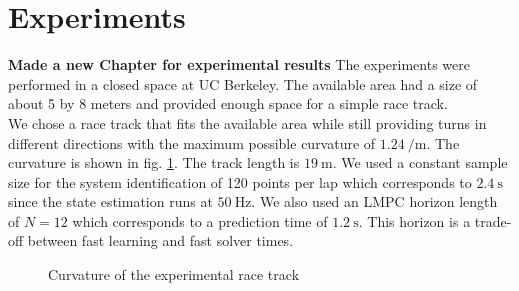 \section{Experiments}
{\bfseries{Made a new Chapter for experimental results}} The experiments were performed in a closed space at UC Berkeley. The available area had a size of about 5 by 8 meters and provided enough space for a simple race track.\\
We chose a race track that fits the available area while still providing turns in different directions with the maximum possible curvature of $\SI{1.24}{\per\meter}$. The curvature is shown in fig. \ref{fig:exp_curv}. The track length is $\SI{19}{\meter}$.
We used a constant sample size for the system identification of 120 points per lap which corresponds to $\SI{2.4}{\second}$ since the state estimation runs at $\SI{50}{\hertz}$. We also used an LMPC horizon length of $N=12$ which corresponds to a prediction time of $\SI{1.2}{\second}$. This horizon is a trade-off between fast learning and fast solver times.
\begin{figure}[ht]
    \centering
      
    \caption{Curvature of the experimental race track}
    \label{fig:exp_curv}
\end{figure}

